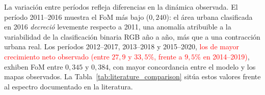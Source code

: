 \begin{table}[htbp]
\centering
\caption{Métricas de validación en las cinco ventanas quinquenales (WoE-AC, umbral $\theta=0{,}85$).}
\label{tab:metrics_all_periods}
\small
\setlength{\tabcolsep}{3.5pt}
\end{table}

La variación entre períodos refleja diferencias en la dinámica observada. El período 2011--2016 muestra el FoM más bajo ($0{,}240$): el área urbana clasificada en 2016 \textit{decreció} levemente respecto a 2011, una anomalía atribuible a la variabilidad de la clasificación binaria RGB año a año, más que a una contracción urbana real. Los períodos 2012--2017, 2013--2018 y 2015--2020, \textcolor{red}{los de mayor crecimiento neto observado (entre $27{,}9$ y $33{,}5\%$, frente a $9{,}5\%$ en 2014--2019)}, exhiben FoM entre $0{,}345$ y $0{,}384$, con mayor concordancia entre el modelo y los mapas observados. La Tabla~\ref{tab:literature_comparison} sitúa estos valores frente al espectro documentado en la literatura.

